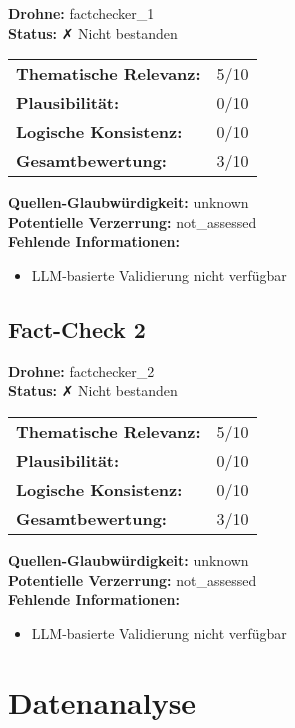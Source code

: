 \documentclass[12pt,a4paper]{article}
\begin{document}
\textbf{Drohne:} factchecker\_1\\
\textbf{Status:} ✗ Nicht bestanden\\

\begin{tabular}{ll}
\textbf{Thematische Relevanz:} & 5/10 \\
\textbf{Plausibilität:} & 0/10 \\
\textbf{Logische Konsistenz:} & 0/10 \\
\textbf{Gesamtbewertung:} & 3/10 \\
\end{tabular}

\textbf{Quellen-Glaubwürdigkeit:} unknown\\
\textbf{Potentielle Verzerrung:} not\_assessed\\
\textbf{Fehlende Informationen:}
\begin{itemize}
\item LLM-basierte Validierung nicht verfügbar
\end{itemize}

\subsection{Fact-Check 2}

\textbf{Drohne:} factchecker\_2\\
\textbf{Status:} ✗ Nicht bestanden\\

\begin{tabular}{ll}
\textbf{Thematische Relevanz:} & 5/10 \\
\textbf{Plausibilität:} & 0/10 \\
\textbf{Logische Konsistenz:} & 0/10 \\
\textbf{Gesamtbewertung:} & 3/10 \\
\end{tabular}

\textbf{Quellen-Glaubwürdigkeit:} unknown\\
\textbf{Potentielle Verzerrung:} not\_assessed\\
\textbf{Fehlende Informationen:}
\begin{itemize}
\item LLM-basierte Validierung nicht verfügbar
\end{itemize}


\newpage
\section{Datenanalyse}
\end{document}
